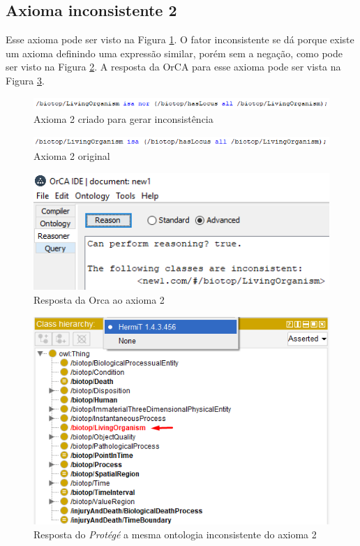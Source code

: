 \documentclass{bcc}
\begin{document}
\subsection{Axioma inconsistente 2}
Esse axioma pode ser visto na Figura \ref{fig:axiomai_2}. O fator inconsistente se dá porque existe um axioma definindo uma expressão similar, porém sem a negação, como pode ser visto na Figura \ref{fig:axiomai_2_o}. A resposta da OrCA para esse axioma pode ser vista na Figura \ref{fig:axiomai_2_res}.

\begin{figure}[H]
\centering
\includegraphics[width=.9\textwidth]{Figuras/axiomai_2.png}
\caption{Axioma 2 criado para gerar inconsistência} 
\label{fig:axiomai_2}
\end{figure}

\begin{figure}[H]
\centering
\includegraphics[width=.9\textwidth]{Figuras/axiomai_2_o.png}
\caption{Axioma 2 original} 
\label{fig:axiomai_2_o}
\end{figure}

\begin{figure}[H]
\centering
\includegraphics[width=.6\textwidth]{Figuras/axiomai_2_res.png}
\caption{Resposta da Orca ao axioma 2} 
\label{fig:axiomai_2_res}
\end{figure}

\begin{figure}[H]
\centering
\includegraphics[width=.6\textwidth]{Figuras/axiomai_2_protege.png}
\caption{Resposta do \textit{Protégé} a mesma ontologia inconsistente do axioma 2} 
\label{fig:axiomai_2_protege}
\end{figure}
\end{document}
